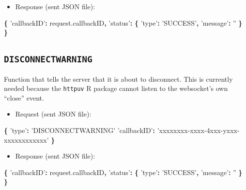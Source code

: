 \documentclass[]{book}
\newenvironment{Shaded}{\begin{snugshade}}{\end{snugshade}}
\newcommand{\AttributeTok}[1]{\textcolor[rgb]{0.77,0.63,0.00}{#1}}
\newcommand{\NormalTok}[1]{#1}
\newcommand{\OperatorTok}[1]{\textcolor[rgb]{0.81,0.36,0.00}{\textbf{#1}}}
\newcommand{\StringTok}[1]{\textcolor[rgb]{0.31,0.60,0.02}{#1}}
\newcommand{\VariableTok}[1]{\textcolor[rgb]{0.00,0.00,0.00}{#1}}
\providecommand{\tightlist}{%
  \setlength{\itemsep}{0pt}\setlength{\parskip}{0pt}}
\theoremstyle{definition}
\theoremstyle{definition}
\theoremstyle{definition}
\theoremstyle{remark}
\begin{document}
\begin{itemize}
\tightlist
\item
  Response (sent JSON file):
\end{itemize}

\begin{Shaded}
\begin{Highlighting}[]
\OperatorTok{\{}
  \StringTok{'callbackID'}\OperatorTok{:} \VariableTok{request}\NormalTok{.}\AttributeTok{callbackID}\OperatorTok{,}
  \StringTok{'status'}\OperatorTok{:} \OperatorTok{\{}
    \StringTok{'type'}\OperatorTok{:} \StringTok{'SUCCESS'}\OperatorTok{,}
    \StringTok{'message'}\OperatorTok{:} \StringTok{''}
  \OperatorTok{\}}
\OperatorTok{\}}
\end{Highlighting}
\end{Shaded}

\hypertarget{disconnectwarning}{%
\subsection{\texorpdfstring{\texttt{DISCONNECTWARNING}}{DISCONNECTWARNING}}\label{disconnectwarning}}

Function that tells the server that it is about to disconnect. This is
currently needed because the \texttt{httpuv} R package cannot listen to
the websocket's own ``close'' event.

\begin{itemize}
\tightlist
\item
  Request (sent JSON file):
\end{itemize}

\begin{Shaded}
\begin{Highlighting}[]
\OperatorTok{\{}
  \StringTok{'type'}\OperatorTok{:} \StringTok{'DISCONNECTWARNING'}
  \StringTok{'callbackID'}\OperatorTok{:} \StringTok{'xxxxxxxx-xxxx-4xxx-yxxx-xxxxxxxxxxxx'}
\OperatorTok{\}}
\end{Highlighting}
\end{Shaded}

\begin{itemize}
\tightlist
\item
  Response (sent JSON file):
\end{itemize}

\begin{Shaded}
\begin{Highlighting}[]
\OperatorTok{\{}
  \StringTok{'callbackID'}\OperatorTok{:} \VariableTok{request}\NormalTok{.}\AttributeTok{callbackID}\OperatorTok{,}
  \StringTok{'status'}\OperatorTok{:} \OperatorTok{\{}
    \StringTok{'type'}\OperatorTok{:} \StringTok{'SUCCESS'}\OperatorTok{,}
    \StringTok{'message'}\OperatorTok{:} \StringTok{''}
  \OperatorTok{\}}
\OperatorTok{\}}
\end{Highlighting}
\end{Shaded}
\end{document}
